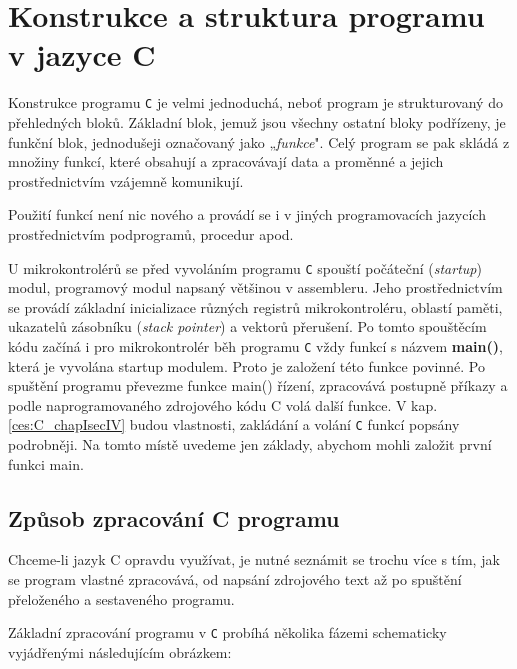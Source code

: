   \section{Konstrukce a struktura programu v jazyce C}\label{ces:C_chapIsecII}
    Konstrukce programu \texttt{C} je velmi jednoduchá, neboť program je strukturovaný do 
    přehledných bloků. Základní blok, jemuž jsou všechny ostatní
    bloky podřízeny, je funkční blok, jednodušeji označovaný jako „\emph{funkce}". Celý program
    se pak skládá z množiny funkcí, které obsahují a zpracovávají data a proměnné a jejich 
    prostřednictvím vzájemně komunikují.
    
    Použití funkcí není nic nového a provádí se i v jiných programovacích jazycích prostřednictvím 
    podprogramů, procedur apod.
    
    U mikrokontrolérů se před vyvoláním programu \texttt{C} spouští počáteční (\emph{startup})
    modul, programový modul napsaný většinou v assembleru. Jeho prostřednictvím se provádí základní 
    inicializace různých registrů mikrokontroléru, oblastí paměti, ukazatelů zásobníku (\emph{stack 
    pointer}) a vektorů přerušení. Po tomto spouštěcím kódu začíná i pro mikrokontrolér běh 
    programu \texttt{C} vždy funkcí s názvem \textbf{main()}, která je vyvolána startup modulem. 
    Proto je založení této funkce povinné. Po spuštění programu převezme funkce main() řízení, 
    zpracovává postupně příkazy a podle naprogramovaného zdrojového kódu C volá další funkce. V 
    kap. \ref{ces:C_chapIsecIV} budou vlastnosti, zakládání a volání \texttt{C} funkcí popsány 
    podrobněji. Na tomto místě uvedeme jen základy, abychom mohli založit první funkci main.

    
    \subsection{Způsob zpracování C programu}
      Chceme-li jazyk C opravdu využívat, je nutné seznámit se trochu více s tím, jak se program 
      vlastné zpracovává, od napsání zdrojového text až po spuštění přeloženého a sestaveného 
      programu.
      
      Základní zpracování programu v \texttt{C} probíhá několika fázemi schematicky vyjádřenými 
      následujícím obrázkem: 

      
